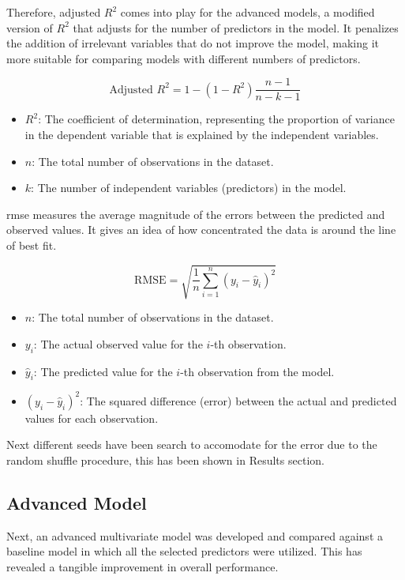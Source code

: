 Therefore, adjusted $R^2$ comes into play for the advanced models, a modified version of $ R^2$ that adjusts for the number of predictors in the model. It penalizes the addition of irrelevant variables that do not improve the model, making it more suitable for comparing models with different numbers of predictors.

\[
\text{Adjusted } R^2 = 1 - \left(1 - R^2\right) \frac{n - 1}{n - k - 1}
\]

\begin{itemize}
    \item \( R^2 \): The coefficient of determination, representing the proportion of variance in the dependent variable that is explained by the independent variables.
    \item \( n \): The total number of observations in the dataset.
    \item \( k \): The number of independent variables (predictors) in the model.
\end{itemize}

\ac{rmse} measures the average magnitude of the errors between the predicted and observed values. It gives an idea of how concentrated the data is around the line of best fit.

\[
\text{RMSE} = \sqrt{\frac{1}{n} \sum_{i=1}^{n} (y_i - \hat{y}_i)^2}
\]

\begin{itemize}
    \item \( n \): The total number of observations in the dataset.
    \item \( y_i \): The actual observed value for the \(i\)-th observation.
    \item \( \hat{y}_i \): The predicted value for the \(i\)-th observation from the model.
    \item \( (y_i - \hat{y}_i)^2 \): The squared difference (error) between the actual and predicted values for each observation.
\end{itemize}

Next different seeds have been search to accomodate for the error due to the random shuffle procedure, this has been shown in Results section. 

\subsection{Advanced Model}\label{sec:advanced_model}

Next, an advanced multivariate model was developed and compared against a baseline model in which all the selected predictors were utilized. This has revealed a tangible improvement in overall performance. 

